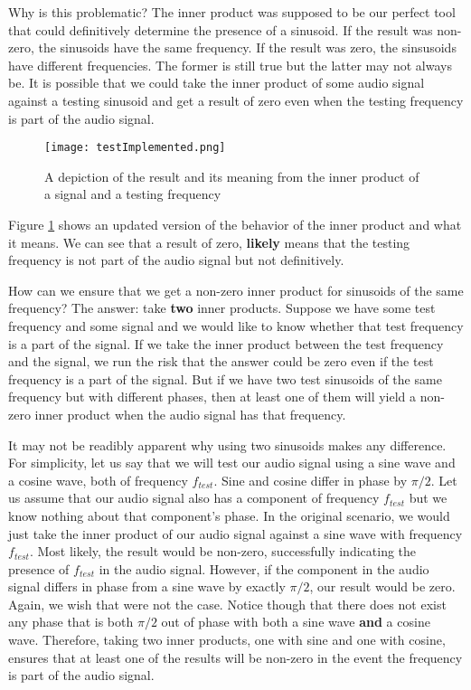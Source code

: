 Why is this problematic?  The inner product was supposed to be our perfect tool that could definitively determine
the presence of a sinusoid.  If the result was non-zero, the sinusoids have the same frequency.  If the result was
zero, the sinsusoids have different frequencies.  The former is still true but the latter may not always be.  It is 
possible that we could take the inner product of some audio signal against a testing sinusoid and get a result
of zero even when the testing frequency is part of the audio signal.  

\begin{figure}[h]
	\caption{A depiction of the result and its meaning from the inner product of a signal and a testing frequency}
	\centering
	\texttt{[image: testImplemented.png]}
	\label{fig:testImplemented}
\end{figure}

\noindent Figure \ref{fig:testImplemented} shows an updated version of the behavior of the inner product and what it means.
We can see that a result of zero, \textbf{likely} means that the testing frequency is not part of the audio signal but not
definitively.

How can we ensure that we get a non-zero inner product for sinusoids of the same frequency?  The answer:
take \textbf{two} inner products.  Suppose we have some test frequency and some signal and we would like to 
know whether that test frequency is a part of the signal.  If we take
the inner product between the test frequency and the signal, we run the risk that the answer could be zero even
if the test frequency is a part of the signal.  But if we have two test sinusoids of the same frequency but with
different phases, then at least one of them will yield a non-zero inner product when the audio signal has
that frequency.  

It may not be readibly apparent why using two sinusoids makes any difference.  For simplicity, let us say that
we will test our audio signal using a sine wave and a cosine wave, both of frequency $f_{test}$.  Sine and cosine 
differ in phase by $\pi/2$.  Let us assume that our audio signal also has a component
of frequency $f_{test}$ but we know nothing about that component's phase.  In the original scenario, we would
just take the inner product of our audio signal against a sine wave with frequency $f_{test}$.  Most likely, the
result would be non-zero, successfully indicating the presence of $f_{test}$ in the audio signal.  However,
if the component in the audio signal differs in phase from a sine wave by exactly $\pi/2$, our result would be
zero.  Again, we wish that were not the case.  Notice though that there does not exist any phase that is both 
$\pi/2$ out of phase with both a sine wave \textbf{and} a cosine wave.  Therefore, taking two inner
products, one with sine and one with cosine, ensures that at least one of the results will be non-zero in the
event the frequency is part of the audio signal.  

